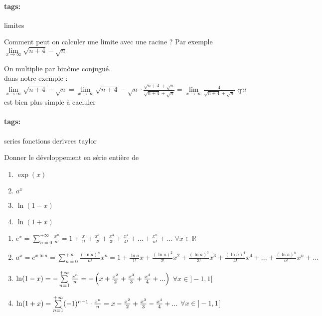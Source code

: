 \documentclass[12pt]{article}
\newcommand*{\xfield}[1]{\begin{mdframed}\centering #1\end{mdframed}\bigskip}
\newenvironment{note}{}{}
\newcommand*{\tags}[1]{\paragraph{tags: }#1}
\begin{document}
\begin{note}
\begin{note}
	\tags{limites}
    \xfield{Comment peut on calculer une limite avec une racine ? Par exemple \\ $\lim\limits_{x \to \infty} \sqrt{n+4} - \sqrt{n}$}
    \xfield{On multiplie par binôme conjugué.\\dans notre exemple :\\ $\lim\limits_{x  \to \infty} \sqrt{n+4} - \sqrt{n} = \lim\limits_{x \to \infty} \sqrt{n+4} - \sqrt{n} \cdot \frac{\sqrt{n+4} + \sqrt{n}}{\sqrt{n+4} + \sqrt{n}} = \lim\limits_{x \to \infty} \frac{4}{\sqrt{n+4} + \sqrt{n}}$ qui est bien plus simple à cacluler}
\end{note}
\begin{note}
	\tags{series fonctions derivees taylor}
	\xfield{Donner le développement en série entière de
	\begin{enumerate}
		\item $\exp(x)$
		\item $a^x$
		\item $\ln(1-x)$
		\item $\ln(1+x)$
	\end{enumerate}}
	\xfield{\begin{enumerate}
		\item $e^x=\sum\limits_{n=0}^{+{\infty}}{\frac{x^n}{n!}} = 1 + \frac{x}{1!} + \frac{x^2}{2!} + \frac{x^3}{3!} + \frac{x^4}{4!} + ... + \frac{x^n}{n!} + ...$ $\forall x \in \mathbb{R}$
		\item $a^x= e^{x \ln a} =\sum\limits_{n=0}^{+{\infty}}{\frac{(\ln a)^n}{n!}}x^n = 1 + \frac{\ln a}{1!}x + \frac{(\ln a )^2}{2!}x^2 + \frac{(\ln a )^3}{3!}x^3 + \frac{(\ln a )^4}{4!}x^4 + ... + \frac{(\ln a )^n}{n!}x^n + ...$
		\item $\ln (1-x)=-\sum\limits_{n=1}^{+{\infty}}{x^{n}\over{n}} = - \left( x + \frac{x^2}{2} + \frac{x^3}{3} + \frac{x^4}{4} + ...\right)$ $\forall x \in ]-1,1[$
		\item $\ln (1+x)=\sum\limits_{n=1}^{+{\infty}}(-1)^{n-1} \cdot {x^{n}\over{n}} = x - \frac{x^2}{2} + \frac{x^3}{3} - \frac{x^4}{4} + ...$  $\forall x \in ]-1,1[$
	\end{enumerate}}
\end{note}


\end{note}
\end{document}
